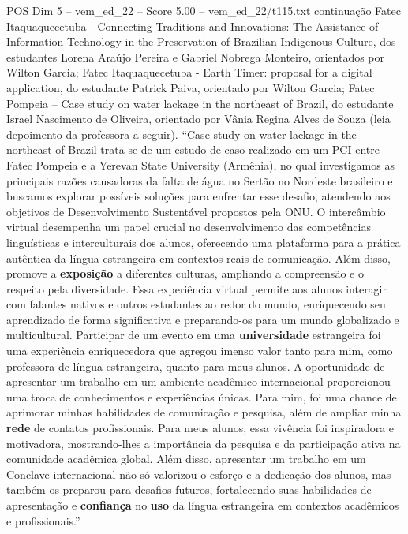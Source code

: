 \begin{textsample}{POS Dim 5 – vem\_ed\_22 – Score 5.00 – vem\_ed\_22/t115.txt}  \label{ex:f5_pos_093}
continuação Fatec Itaquaquecetuba - Connecting Traditions and Innovations: The Assistance of Information Technology in the Preservation of Brazilian Indigenous Culture, dos estudantes Lorena Araújo Pereira e Gabriel Nobrega Monteiro, orientados por Wilton Garcia; Fatec Itaquaquecetuba - Earth Timer: proposal for a digital application, do estudante Patrick Paiva, orientado por Wilton Garcia; Fatec Pompeia – Case study on water lackage in the northeast of Brazil, do estudante Israel Nascimento de Oliveira, orientado por Vânia Regina Alves de Souza (leia depoimento da professora a seguir). “Case study on water lackage in the northeast of Brazil trata-se de um estudo de caso realizado em um PCI entre Fatec Pompeia e a Yerevan State University (Armênia), no qual investigamos as principais razões causadoras da falta de água no Sertão no Nordeste brasileiro e buscamos explorar possíveis soluções para enfrentar esse desafio, atendendo aos objetivos de Desenvolvimento Sustentável propostos pela ONU.
O intercâmbio virtual desempenha um papel crucial no desenvolvimento das competências linguísticas e interculturais dos alunos, oferecendo uma plataforma para a prática autêntica da língua estrangeira em contextos reais de comunicação.
Além disso, promove a \textbf{exposição} a diferentes culturas, ampliando a compreensão e o respeito pela diversidade.
Essa experiência virtual permite aos alunos interagir com falantes nativos e outros estudantes ao redor do mundo, enriquecendo seu aprendizado de forma significativa e preparando-os para um mundo globalizado e multicultural.
Participar de um evento em uma \textbf{universidade} estrangeira foi uma experiência enriquecedora que agregou imenso valor tanto para mim, como professora de língua estrangeira, quanto para meus alunos.
A oportunidade de apresentar um trabalho em um ambiente acadêmico internacional proporcionou uma troca de conhecimentos e experiências únicas.
Para mim, foi uma chance de aprimorar minhas habilidades de comunicação e pesquisa, além de ampliar minha \textbf{rede} de contatos profissionais.
Para meus alunos, essa vivência foi inspiradora e motivadora, mostrando-lhes a importância da pesquisa e da participação ativa na comunidade acadêmica global.
Além disso, apresentar um trabalho em um Conclave internacional não só valorizou o esforço e a dedicação dos alunos, mas também os preparou para desafios futuros, fortalecendo suas habilidades de apresentação e \textbf{confiança} no \textbf{uso} da língua estrangeira em contextos acadêmicos e profissionais.”

\end{textsample}
